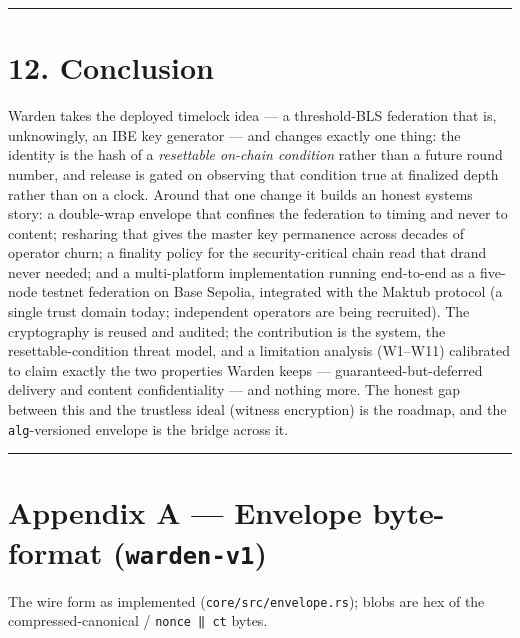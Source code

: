 \documentclass[
  11pt,
]{article}
\begin{document}
\begin{center}\rule{0.5\linewidth}{0.5pt}\end{center}

\section{12. Conclusion}\label{conclusion}

Warden takes the deployed timelock idea --- a threshold-BLS federation
that is, unknowingly, an IBE key generator --- and changes exactly one
thing: the identity is the hash of a \emph{resettable on-chain
condition} rather than a future round number, and release is gated on
observing that condition true at finalized depth rather than on a clock.
Around that one change it builds an honest systems story: a double-wrap
envelope that confines the federation to timing and never to content;
resharing that gives the master key permanence across decades of
operator churn; a finality policy for the security-critical chain read
that drand never needed; and a multi-platform implementation running
end-to-end as a five-node testnet federation on Base Sepolia, integrated
with the Maktub protocol (a single trust domain today; independent
operators are being recruited). The cryptography is reused and audited;
the contribution is the system, the resettable-condition threat model,
and a limitation analysis (W1--W11) calibrated to claim exactly the two
properties Warden keeps --- guaranteed-but-deferred delivery and content
confidentiality --- and nothing more. The honest gap between this and
the trustless ideal (witness encryption) is the roadmap, and the
\texttt{alg}-versioned envelope is the bridge across it.

\begin{center}\rule{0.5\linewidth}{0.5pt}\end{center}

\section{\texorpdfstring{Appendix A --- Envelope byte-format
(\texttt{warden-v1})}{Appendix A --- Envelope byte-format (warden-v1)}}\label{appendix-a-envelope-byte-format-warden-v1}

The wire form as implemented (\texttt{core/src/envelope.rs}); blobs are
hex of the compressed-canonical / \texttt{nonce\ ‖\ ct} bytes.
\end{document}
